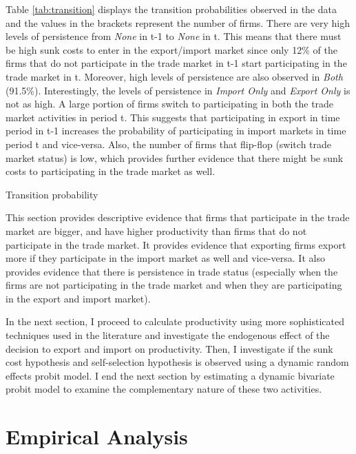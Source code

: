 \documentclass[12pt]{article}
\begin{document}
Table \ref{tab:transition} displays the transition probabilities
observed in the data  and the values in the brackets represent the
number of firms.  There are very high levels of persistence from
\textit{None} in t-1 to \textit{None} in t. This means that there must be high sunk
costs to enter in the export/import market since only 12\% of the
firms  that do not participate in the trade market in t-1 start
participating in the trade market in t. Moreover,   high levels of persistence
are also observed in  \textit{Both}  (91.5\%). Interestingly, the levels of
persistence in \textit{Import Only} and \textit{Export Only}  is not
as high. A large portion of firms switch to participating in both the trade market
activities in period t. This suggests that participating in export in time
period in t-1 increases the probability of participating in import  markets in time period
t and vice-versa. Also, the number of firms that flip-flop (switch
trade market status) is low, which provides further evidence that
there might be sunk costs
to participating in the trade market as well. 

\begin{center}
\begin{table}[H]
\caption{Transition probability}
\label{tab:transition}

\end{table}
\end{center}


This section provides descriptive evidence that firms that participate
in the trade market are bigger, and have higher
productivity than firms that do not participate in the trade
market. It provides evidence that exporting firms export more if they
participate in the import market as well and vice-versa. It also
provides evidence that there is persistence in trade status
(especially when the firms are not participating in the trade market
and when they are participating in the export and import market). 

In the next section, I proceed to calculate productivity using more
sophisticated techniques used in the literature and investigate the endogenous effect
of the decision to export and import on productivity. Then, I investigate if the
sunk cost hypothesis and self-selection hypothesis is observed using a
dynamic random effects probit model. I end the next section by
estimating a dynamic bivariate probit model to examine the complementary
nature of these two activities. 

\section{Empirical Analysis}\label{sec:anal}
\end{document}
